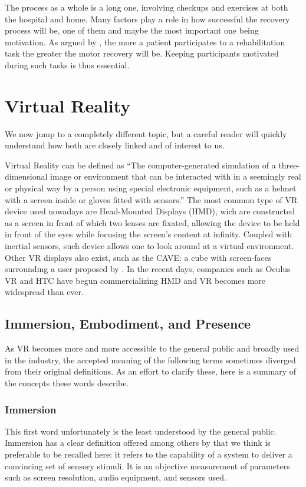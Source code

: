 The process as a whole is a long one, involving checkups and exercises at both the hospital and home. Many factors play a role in how successful the recovery process will be, one of them and maybe the most important one being motivation. As argued by \cite{flores2008improving}, the more a patient participates to a rehabilitation task the greater the motor recovery will be. Keeping participants motivated during such tasks is thus essential.

\section{Virtual Reality}

We now jump to a completely different topic, but a careful reader will quickly understand how both are closely linked and of interest to us.

Virtual Reality can be defined as ``The computer-generated simulation of a three-dimensional image or environment that can be interacted with in a seemingly real or physical way by a person using special electronic equipment, such as a helmet with a screen inside or gloves fitted with sensors.'' \cite{oxford2015} The most common type of VR device used nowadays are Head-Mounted Displays (HMD), wich are constructed as a screen in front of which two lenses are fixated, allowing the device to be held in front of the eyes while focusing the screen's content at infinity. Coupled with inertial sensors, such device allows one to look around at a virtual environment. Other VR displays also exist, such as the CAVE: a cube with screen-faces surrounding a user proposed by \cite{cruz1992cave}. In the recent days, companies such as Oculus VR and HTC have begun commercializing HMD and VR becomes more widespread than ever.

\subsection{Immersion, Embodiment, and Presence}
As VR becomes more and more accessible to the general public and broadly used in the industry, the accepted meaning of the following terms sometimes diverged from their original definitions. As an effort to clarify these, here is a summary of the concepts these words describe.

\subsubsection{Immersion}
This first word unfortunately is the least understood by the general public. Immersion has a clear definition offered among others by \cite{slater2003note,sanchez2005presence} that we think is preferable to be recalled here: it refers to the capability of a system to deliver a convincing set of sensory stimuli. It is an objective measurement of parameters such as screen resolution, audio equipment, and sensors used.


